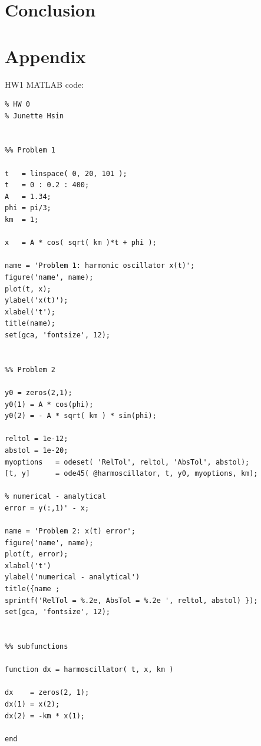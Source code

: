 \documentclass[conf]{new-aiaa}
\begin{document}
\section{Conclusion} 



\newpage
\section{Appendix} 

HW1 MATLAB code: 

\begin{lstlisting}[basicstyle=\footnotesize]
% ASE 389 Orbit Determination
% HW 0
% Junette Hsin 


%% Problem 1 

t   = linspace( 0, 20, 101 ); 
t   = 0 : 0.2 : 400; 
A   = 1.34; 
phi = pi/3; 
km  = 1; 

x   = A * cos( sqrt( km )*t + phi ); 

name = 'Problem 1: harmonic oscillator x(t)'; 
figure('name', name); 
plot(t, x); 
ylabel('x(t)'); 
xlabel('t'); 
title(name); 
set(gca, 'fontsize', 12); 


%% Problem 2 

y0 = zeros(2,1); 
y0(1) = A * cos(phi); 
y0(2) = - A * sqrt( km ) * sin(phi); 

reltol = 1e-12; 
abstol = 1e-20; 
myoptions   = odeset( 'RelTol', reltol, 'AbsTol', abstol); 
[t, y]      = ode45( @harmoscillator, t, y0, myoptions, km); 

% numerical - analytical 
error = y(:,1)' - x; 

name = 'Problem 2: x(t) error'; 
figure('name', name); 
plot(t, error); 
xlabel('t')
ylabel('numerical - analytical')
title({name ;
sprintf('RelTol = %.2e, AbsTol = %.2e ', reltol, abstol) }); 
set(gca, 'fontsize', 12); 


%% subfunctions 

function dx = harmoscillator( t, x, km )

dx    = zeros(2, 1); 
dx(1) = x(2); 
dx(2) = -km * x(1); 

end 
\end{lstlisting}


\newpage

\end{document}

